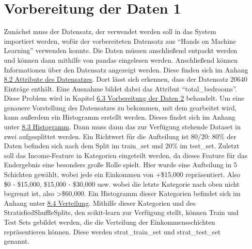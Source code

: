 \section{Vorbereitung der Daten 1}
\label{VorbereitungDerDaten1}
Zunächst muss der Datensatz, der verwendet werden soll in das System importiert werden, wofür der vorbereiteten Datensatz aus “Hands on Machine Learning” verwenden konnte.\cite{DATA} Die Daten müssen anschließend entpackt werden und können dann mithilfe von pandas eingelesen werden. 
Anschließend können Informationen über den Datensatz angezeigt werden. Diese finden sich im Anhang \hyperlink{datensatz}{8.2 Attribute des Datensatzes}. Dort lässt sich erkennen, dass der Datensatz 20640 Einträge enthält. Eine Ausnahme bildet dabei das Attribut “total\_bedrooms”. Diese Problem wird in Kapitel \hyperlink{datensatz}{6.3 Vorbereitung der Daten 2} behandelt.
Um eine genauere Vorstellung des Datensatzes zu bekommen, mit dem gearbeitet wird, kann außerdem ein Histogramm erstellt werden. Dieses findet sich im Anhang unter \hyperlink{datensatz}{8.3 Histogramm}. 
Dann muss dann das zur Verfügung stehende Dataset in zwei aufgesplittet werden. Ein Richtwert für die Aufteilung ist 80/20: 80\% der Daten befinden sich nach dem Split im train\_set und 20\% im test\_set.
Zuletzt soll das Income-Feature in Kategorien eingeteilt werden, da dieses Feature für das Endergebnis eine besonders große Rolle spielt. Hier wurde eine Aufteilung in 5 Schichten gewählt, wobei jede ein Einkommen von +\$15,000 repräsentiert. 
Also \$0 - \$15,000, \$15,000 - \$30,000 usw. wobei die letzte Kategorie nach oben nicht begrenzt ist, also >\$60,000. Ein Histogramm dieser Kategorien befindet sich im Anhang unter \hyperlink{datensatz}{8.4 Verteilung}. Mithilfe dieser Kategorien und des StratisfiedShuffleSplits, den scikit-learn zur Verfügung stellt, können Train und Test Sets gebildet werden, die die Verteilung der Einkommensschichten repräsentieren können. Diese werden strat\_train\_set und strat\_test\_set genannt.


